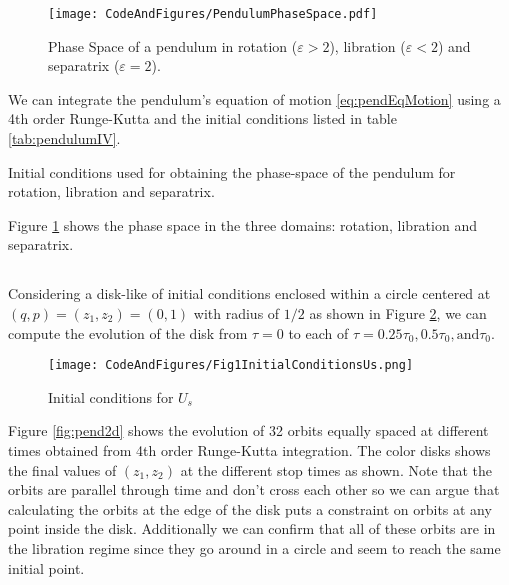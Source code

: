 \begin{figure}[h]
    \centering
    \texttt{[image: CodeAndFigures/PendulumPhaseSpace.pdf]}
    \caption{Phase Space of a pendulum in rotation ($\varepsilon>2$), libration ($\varepsilon<2$) and separatrix ($\varepsilon=2$).}
    \label{fig:pendPhaseSpace}
\end{figure}

We can integrate the pendulum's equation of motion \ref{eq:pendEqMotion} using a 4th order Runge-Kutta and the initial conditions listed in table \ref{tab:pendulumIV}.

\begin{table}[h]
    \centering
    
    \caption{Initial conditions used for obtaining the phase-space of the pendulum for rotation, libration and separatrix.}
    \label{tab:pendulumIV}
\end{table}

Figure \ref{fig:pendPhaseSpace} shows the phase space in the three domains: rotation, libration and separatrix.

\subsection{}
Considering a disk-like of initial conditions enclosed within a circle centered at $(q,p)=(z_1,z_2)=(0,1)$ with radius of $1/2$ as shown in Figure \ref{fig:MartinsUs}, we can compute the evolution of the disk from $\tau=0$ to each of $\tau=0.25\tau_0,0.5\tau_0,\mathrm{and}\tau_0$.
\begin{figure}[h]
    \centering
    \texttt{[image: CodeAndFigures/Fig1InitialConditionsUs.png]}
    \caption{Initial conditions for $U_s$}
    \label{fig:MartinsUs}
\end{figure}

Figure \ref{fig:pend2d} shows the evolution of 32 orbits equally spaced at different times obtained from 4th order Runge-Kutta integration. The color disks shows the final values of $(z_1,z_2)$ at the different stop times as shown. Note that the orbits are parallel through time and don't cross each other so we can argue that calculating the orbits at the edge of the disk puts a constraint on orbits at any point inside the disk. Additionally we can confirm that all of these orbits are in the libration regime since they go around in a circle and seem to reach the same initial point.

